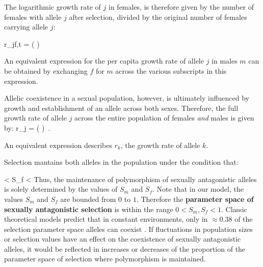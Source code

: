 \documentclass[12pt]{article}
\let\oldequation\equation
\let\oldendequation\endequation
\renewenvironment{equation}
  {\linenomathNonumbers\oldequation}
  {\oldendequation\endlinenomath}
\begin{document}
 The logarithmic growth rate of $j$ in females, is therefore given by the number of females with allele $j$ after selection, divided by the original number of females carrying allele $j$:



 \begin{equation}
     r_{jf,t} = \ln \left(  \right)
     \label{canonical}
 \end{equation}

 An equivalent expression for the per capita growth rate of allele $j$ in males $m$ can be obtained by exchanging $f$ for $m$ across the various subscripts in this expression.

 Allelic coexistence in a sexual population, however, is ultimately influenced by growth and establishment of an allele across both sexes. Therefore, the full growth rate of allele $j$ across the entire population of females \emph{and} males is given by:
 \begin{equation}
     r_{j} = \ln \left(   \right) \,.
     \label{full}
 \end{equation}

An equivalent expression describes $r_{k}$, the growth rate of allele $k$.

Selection mantains both alleles in the population under the condition that:

\begin{equation}
 < S_{f} < 
\label{selection}
\end{equation}
\citep{kidwell1977regions,pamilo1979genic,connallon2018environmental}
Thus, the maintenance of polymorphism of sexually antagonistic alleles is solely determined by the values of $S_{m}$ and $S_{f}$. Note that in our model, the values $S_{m}$ and $S_{f}$ are bounded from $0$ to $1$. Therefore the \textbf{parameter space of sexually antagonistic selection} is within the range $ 0< S_{m}, S_{f} < 1$. Classic theoretical models predict that in constant environments, only in $\approx 0.38$ of the selection parameter space alleles can coexist \citep{kidwell1977regions,pamilo1979genic,connallon_evolutionary_2018}.  If fluctuations in population sizes or selection values have an effect on the coexistence of sexually antagonistic alleles, it would be reflected in increases or decreases of the proportion of the parameter space of selection where polymorphism is maintained.
\end{document}
